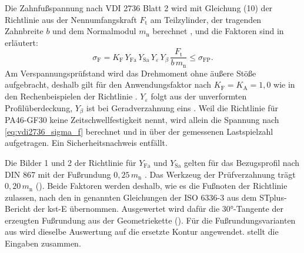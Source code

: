 Die Zahnfußspannung nach VDI 2736 Blatt 2 wird mit Gleichung (10) der Richtlinie aus der Nennumfangskraft $F_{\mathrm{t}}$ am Teilzylinder, der tragenden Zahnbreite $b$ und dem Normalmodul $m_{\mathrm{n}}$ berechnet \cite[S.~11]{VDI2736-2}, und die Faktoren sind in  erläutert:
\begin{equation}
	\sigma_{\mathrm{F}} = K_{\mathrm{F}}\,Y_{\mathrm{Fa}}\,Y_{\mathrm{Sa}}\,Y_{\varepsilon}\,Y_{\beta}\,\frac{F_{\mathrm{t}}}{b\,m_{\mathrm{n}}} \leq \sigma_{\mathrm{FP}} .
	\label{eq:vdi2736_sigma_f}
\end{equation}
Am Verspannungsprüfstand wird das Drehmoment ohne äußere Stöße aufgebracht, deshalb gilt für den Anwendungsfaktor nach \cite[Abschnitt 5, S.~19]{ISO6336-1} $K_{\mathrm{F}} = K_{\mathrm{A}} = 1{,}0$ wie in den Rechenbeispielen der Richtlinie \cite[S.~11 und 25 bis 28]{VDI2736-2}. $Y_{\varepsilon}$ folgt aus der unverformten Profilüberdeckung, $Y_{\beta}$ ist bei Geradverzahnung eins \cite[S.~13]{VDI2736-2}. Weil die Richtlinie für PA46-GF30 keine Zeitschwellfestigkeit nennt, wird allein die Spannung nach \eqref{eq:vdi2736_sigma_f} berechnet und in  über der gemessenen Lastspielzahl aufgetragen. Ein Sicherheitsnachweis entfällt.

Die Bilder 1 und 2 der Richtlinie für $Y_{\mathrm{Fa}}$ und $Y_{\mathrm{Sa}}$ gelten für das Bezugsprofil nach DIN 867 mit der Fußrundung $0{,}25\,m_{\mathrm{n}}$ \cite[S.~12 bis 13]{VDI2736-2}. Das Werkzeug der Prüfverzahnung trägt $0{,}20\,m_{\mathrm{n}}$ (). Beide Faktoren werden deshalb, wie es die Fußnoten der Richtlinie zulassen, nach den in  genannten Gleichungen der ISO 6336-3 aus dem STplus-Bericht der kst-E übernommen. Ausgewertet wird dafür die $30$°-Tangente der erzeugten Fußrundung aus der Geometriekette (). Für die Fußrundungsvarianten aus  wird dieselbe Auswertung auf die ersetzte Kontur angewendet.  stellt die Eingaben zusammen.


